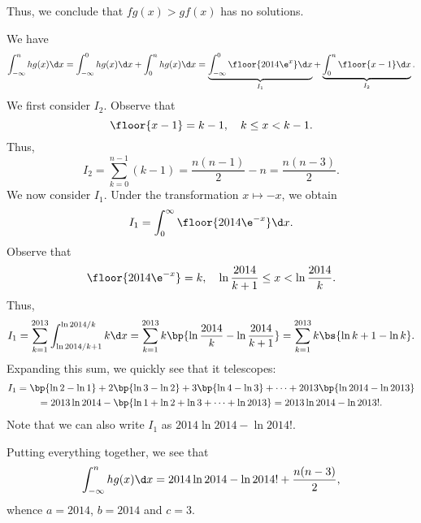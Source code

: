 \begin{solution}
\begin{ppart}
        Thus, we conclude that $fg(x) > gf(x)$ has no solutions.
    \end{ppart}
    \begin{ppart}
        We have \[\int_{-\infty}^n hg(x) \d x = \int_{-\infty}^0 hg(x) \d x + \int_{0}^n hg(x) \d x = \underbrace{\int_{-\infty}^0 \floor{2014 \e^x} \d x}_{I_1} + \underbrace{\int_0^n \floor{x-1} \d x}_{I_2}.\] We first consider $I_2$. Observe that \[\floor{x-1} = k-1, \quad \text{$k \leq x < k-1$}.\] Thus, \[I_2 = \sum_{k = 0}^{n-1} (k-1) = \frac{n(n-1)}{2} - n = \frac{n(n-3)}{2}.\] We now consider $I_1$. Under the transformation $x \mapsto -x$, we obtain \[I_1 = \int_0^\infty \floor{2014\e^{-x}}\d x.\] Observe that \[\floor{2014\e^{-x}} = k, \quad \text{$\ln \frac{2014}{k+1} \leq x < \ln \frac{2014}{k}$}.\] Thus, \[I_1 = \sum_{k=1}^{2013} \int_{\ln{2014/k+1}}^{\ln{2014/k}} k \d x = \sum_{k=1}^{2013} k \bp{\ln \frac{2014}{k} - \ln \frac{2014}{k+1}} = \sum_{k=1}^{2013} k \bs{\ln{k+1} - \ln k}.\] Expanding this sum, we quickly see that it telescopes:
        \begin{gather*}
            I_1 = \bp{\ln 2 - \ln 1} + 2\bp{\ln 3 - \ln 2} + 3 \bp{\ln 4 - \ln 3} + \dots + 2013 \bp{\ln 2014 - \ln 2013}\\
            = 2013 \ln 2014 -\bp{\ln 1 + \ln 2 + \ln 3 + \dots + \ln 2013} = 2013 \ln 2014 - \ln 2013!.
        \end{gather*}
        Note that we can also write $I_1$ as $2014 \ln 2014 - \ln 2014!$. 
        
        Putting everything together, we see that \[\int_{-\infty}^n hg(x) \d x = 2014 \ln 2014 - \ln 2014! + \frac{n(n-3)}{2},\] whence $a = 2014$, $b = 2014$ and $c = 3$.
    \end{ppart}
\end{solution}